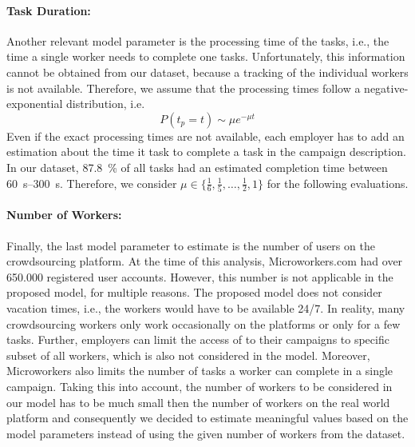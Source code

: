 \paragraph*{Task Duration: }Another relevant model parameter is the processing time of the tasks, i.e., the time a single worker needs to complete one tasks.
Unfortunately, this information cannot be obtained from our dataset, because a tracking of the individual workers is not available.
Therefore, we assume that the processing times follow a negative-exponential distribution, i.e.
\begin{equation*}
P(t_p=t) \sim \mu  e^{-{\mu}t}
\end{equation*}
Even if the exact processing times are not available, each employer has to add an estimation about the time it task to complete a task in the campaign description.
In our dataset, \SI{87.8}{\percent} of all tasks had an estimated completion time between \SIrange{60}{300}{\second}.
Therefore, we consider \(\mu \in \{\frac{1}{6},\frac{1}{5},\hdots,\frac{1}{2},1\}\) for the following evaluations.

\paragraph*{Number of Workers: }Finally, the last model parameter to estimate is the number of users on the crowdsourcing platform. 
At the time of this analysis, Microworkers.com had over 650.000 registered user accounts.
However, this number is not applicable in the proposed model, for multiple reasons.
The proposed model does not consider vacation times, i.e., the workers would have to be available 24/7.
In reality, many crowdsourcing workers only work occasionally on the platforms or only for a few tasks.
Further, employers can limit the access of to their campaigns to specific subset of all workers, which is also not considered in the model.
Moreover, Microworkers also limits the number of tasks a worker can complete in a single campaign.
Taking this into account, the number of workers to be considered in our model has to be much small then the number of workers on the real world platform and consequently we decided to estimate meaningful values based on the model parameters instead of using the given number of workers from the dataset.

